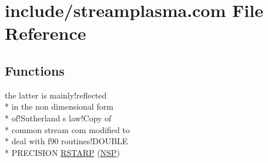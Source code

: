 \hypertarget{streamplasma_8com}{\section{include/streamplasma.com File Reference}
\label{streamplasma_8com}
}
\subsection*{Functions}
\begin{DoxyCompactItemize}
\item 
the latter is mainly!reflected \\*
in the non dimensional form \\*
of!\-Sutherland s law!\-Copy of \\*
common stream com modified to \\*
deal with f90 routines!\-D\-O\-U\-B\-L\-E \\*
P\-R\-E\-C\-I\-S\-I\-O\-N \hyperlink{streamplasma_8com_a76abf75af621904eb5e5121688592949}{R\-S\-T\-A\-R\-P} (\hyperlink{four_8com_aa0cef1d162909c91ecc4ab6954d16e82}{N\-S\-P})
\end{DoxyCompactItemize}
